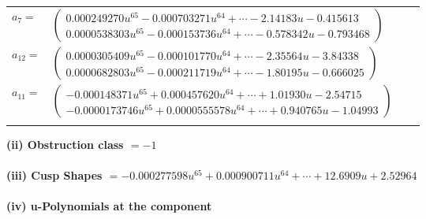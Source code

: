 \documentclass[1p]{elsarticle_modified}
\theoremstyle{definition}
\begin{document}
\begin{tabular}{m{7pt} m{180pt} m{7pt} m{180pt} }
\flushright $a_{7}=$&$\begin{pmatrix}0.000249270 u^{65}-0.000703271 u^{64}+\cdots-2.14183 u-0.415613\\0.0000538303 u^{65}-0.000153736 u^{64}+\cdots-0.578342 u-0.793468\end{pmatrix}$ \\
\flushright $a_{12}=$&$\begin{pmatrix}0.0000305409 u^{65}-0.000101770 u^{64}+\cdots-2.35564 u-3.84338\\0.0000682803 u^{65}-0.000211719 u^{64}+\cdots-1.80195 u-0.666025\end{pmatrix}$ \\
\flushright $a_{11}=$&$\begin{pmatrix}-0.000148371 u^{65}+0.000457620 u^{64}+\cdots+1.01930 u-2.54715\\-0.0000173746 u^{65}+0.0000555578 u^{64}+\cdots+0.940765 u-1.04993\end{pmatrix}$\\&\end{tabular}
\flushleft \textbf{(ii) Obstruction class $= -1$}\\~\\
\flushleft \textbf{(iii) Cusp Shapes $= -0.000277598 u^{65}+0.000900711 u^{64}+\cdots+12.6909 u+2.52964$}\\~\\
\newpage\renewcommand{\arraystretch}{1}
\flushleft \textbf{(iv) u-Polynomials at the component}\newline \\
\end{document}
